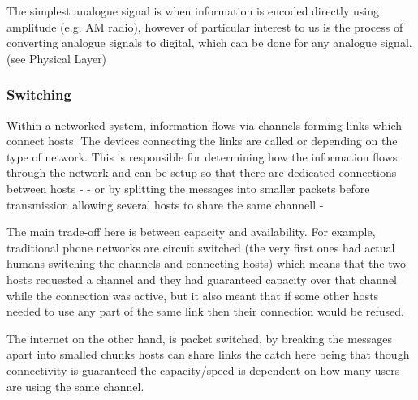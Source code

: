 
	\par{The simplest analogue signal is when information is encoded directly using amplitude (e.g. AM radio), however of particular interest to us is the process of converting analogue signals to digital, which can be done for any analogue signal. (see Physical Layer) }

	\subsubsection{Switching}






	\par{Within a networked system, information flows via channels forming links which connect hosts. The devices connecting the links are called  or  depending on the type of network. This  is responsible for determining how the information flows through the network and can be setup so that there are dedicated connections between hosts -  - or by splitting the messages into smaller packets before transmission allowing several hosts to share the same channell - }



	\par{The main trade-off here is between capacity and availability. For example, traditional phone networks are circuit switched (the very first ones had actual humans switching the channels and connecting hosts) which means that the two hosts requested a channel and they had guaranteed capacity over that channel while the connection was active, but it also meant that if some other hosts needed to use any part of the same link then their connection would be refused.}
	\par{The internet on the other hand, is packet switched, by breaking the messages apart into smalled chunks hosts can share links the catch here being that though connectivity is guaranteed the capacity/speed is dependent on how many users are using the same channel.}


